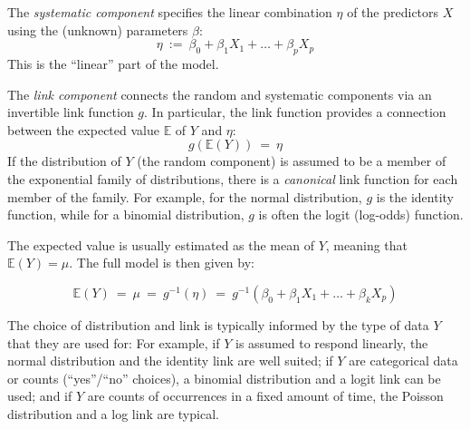 The \emph{systematic component} specifies the linear combination $\eta$ of the predictors $X$
using the (unknown) parameters $\beta$:
\begin{equation}
\label{supp:sec:GLM:eq:eta}
    \eta ~:=~ \beta_0 + \beta_1 X_1 + \dots + \beta_p X_p
\end{equation}
This is the ``linear'' part of the model.

The \emph{link component} connects the random and systematic components via an invertible link function $g$.
In particular, the link function provides a connection between the expected value $\mathbb{E}$ of $Y$ and $\eta$:
\begin{equation}
\label{supp:sec:GLM:eq:link}
    g(\mathbb{E}(Y)) ~=~ \eta
\end{equation}
If the distribution of $Y$ (the random component) is assumed to be a member of the exponential family of distributions,
there is a \emph{canonical} link function for each member of the family.
For example, for the normal distribution, $g$ is the identity function,
while for a binomial distribution, $g$ is often the logit (log-odds) function.

The expected value is usually estimated as the mean of $Y$, meaning that $\mathbb{E}(Y) = \mu$.
The full model is then given by:

\begin{equation}
    \label{supp:sec:GLM:eq:GLM}
    \mathbb{E}(Y) ~=~ \mu ~=~ g^{-1}(\eta) ~=~ g^{-1}( \beta_0 + \beta_1 X_1 + \dots + \beta_k X_p )
\end{equation}


The choice of distribution and link is typically informed by the type of data $Y$ that they are used for:
For example, if $Y$ is assumed to respond linearly, the normal distribution and the identity link are well suited;
if $Y$ are categorical data or counts (``yes''/``no'' choices), a binomial distribution and a logit link can be used;
and if $Y$ are counts of occurrences in a fixed amount of time, the Poisson distribution and a log link are typical.

